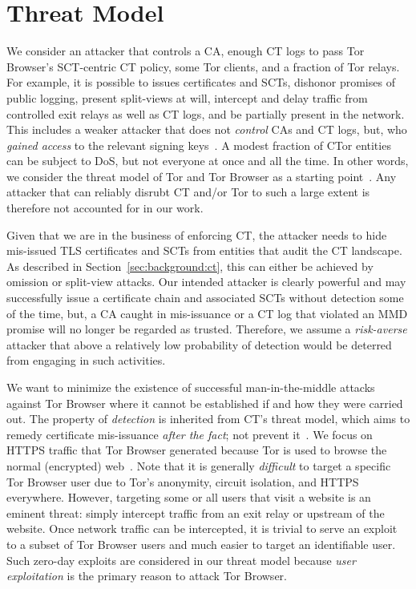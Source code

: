 \section{Threat Model} \label{sec:adversary}
%
%
We consider an attacker that controls
	a CA,
	enough CT logs to pass Tor Browser's SCT-centric CT policy, 
	some Tor clients, and
	a fraction of Tor relays.
For example, it is possible to
	issues certificates and SCTs,
	dishonor promises of public logging,
	present split-views at will,
	intercept and delay traffic from controlled exit relays as well as CT logs,
		and
	be partially present in the network.
This includes a weaker attacker that does not \emph{control} CAs and CT logs,
but, who \emph{gained access} to the relevant signing keys~\cite{turktrust,%
gdca1-omission}.  A modest fraction of CTor entities can be subject to DoS, but
not everyone at once and all the time.  In other words, we consider the threat
model of Tor and Tor Browser as a starting point~\cite{tor,tor-browser}.  Any
attacker that can reliably disrubt CT and/or Tor to such a large extent is
therefore not accounted for in our work.

%
%
Given that we are in the business of enforcing CT, the attacker needs to hide
mis-issued TLS certificates and SCTs from entities that audit the CT landscape.
As described in Section~\ref{sec:background:ct}, this can either be achieved by
omission or split-view attacks.  Our intended attacker is clearly powerful and may
successfully issue a certificate chain and associated SCTs without detection
some of the time, but, a CA caught in mis-issuance or a CT log that violated an
MMD promise will no longer be regarded as trusted.  Therefore, we assume a
\emph{risk-averse} attacker that above a relatively low probability of detection
would be deterred from engaging in such activities.

%
%
We want to minimize the existence of successful man-in-the-middle attacks
against Tor Browser where it cannot be established if
and how they were carried out.  The property of \emph{detection} is inherited
from CT's threat model, which aims to remedy certificate mis-issuance
\emph{after the fact}; not prevent it~\cite{ct/a}.  We
focus on HTTPS traffic that Tor Browser generated because Tor is used to browse
the normal (encrypted) web~\cite{mani}.  Note that it is generally
\emph{difficult} to target a specific Tor Browser user due to Tor's anonymity,
circuit isolation, and HTTPS everywhere.  However, targeting some or all 
users that visit a website is an eminent threat:
	simply intercept traffic from an exit relay or
	upstream of the website.
Once network traffic can be intercepted, it is trivial to serve an exploit to a
subset of Tor Browser users and much easier to target an identifiable user.
Such zero-day exploits are considered in our threat model because \emph{user
exploitation} is the primary reason to attack Tor Browser.

